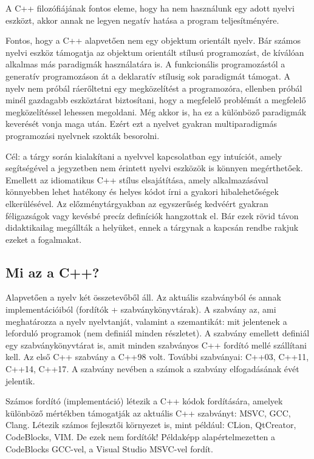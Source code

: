 \documentclass[../cpp_book/cpp_book.tex]{subfiles}
\begin{document}
	A C++ filozófiájának fontos eleme, hogy ha nem használunk egy adott nyelvi eszközt, akkor annak ne legyen negatív hatása a program teljesítményére.
	
	Fontos, hogy a C++ alapvetően nem egy objektum orientált nyelv. Bár számos nyelvi eszköz támogatja az objektum orientált stílusú programozást, de kíválóan alkalmas más paradigmák használatára is. A funkcionális programozástól a generatív programozáson át a deklaratív stílusig sok paradigmát támogat. A nyelv nem próbál ráerőltetni egy megközelítést a programozóra, ellenben próbál minél gazdagabb eszköztárat biztosítani, hogy a megfelelő problémát a megfelelő megközelítéssel lehessen megoldani. Még akkor is, ha ez a különböző paradigmák keverését vonja maga után. Ezért ezt a nyelvet gyakran multiparadigmás programozási nyelvnek szokták besorolni. 

	\medskip
	Cél: a tárgy során kialakítani a nyelvvel kapcsolatban egy intuíciót, amely segítségével a jegyzetben nem érintett nyelvi eszközök is könnyen megérthetőek. Emellett az idiomatikus C++ stílus elsajátítása, amely alkalmazásával könnyebben lehet hatékony és helyes kódot írni a gyakori hibalehetőségek elkerülésével. Az előzménytárgyakban az egyszerűség kedvéért gyakran féligazságok vagy kevésbé precíz definíciók hangzottak el. Bár ezek rövid távon didaktikailag megállták a helyüket, ennek a tárgynak a kapcsán rendbe rakjuk ezeket a fogalmakat.

	\subsection{Mi az a C++?}
	Alapvetően a nyelv két összetevőből áll. Az aktuális szabványból és annak implementációiból (fordítók + szabványkönyvtárak). A szabvány az, ami meghatározza a nyelv nyelvtanját, valamint a szemantikát: mit jelentenek a leforduló programok (nem definiál minden részletet). A szabvány emellett definiál egy szabványkönyvtárat is, amit minden szabványos C++ fordító mellé szállítani kell. Az első C++ szabvány a {C++98} volt. További szabványai: {C++03}, {C++11}, {C++14}, {C++17}. A szabvány nevében a számok a szabvány elfogadásának évét jelentik. 
	
	\medskip
	Számos fordító (implementáció) létezik a C++ kódok fordítására, amelyek különböző mértékben támogatják az aktuális C++ szabványt: MSVC, GCC, Clang.
	Létezik számos fejlesztői környezet is, mint például: CLion, QtCreator, CodeBlocks, VIM. De ezek nem fordítók! Példaképp alapértelmezetten a CodeBlocks GCC-vel, a Visual Studio MSVC-vel fordít.
\end{document}
